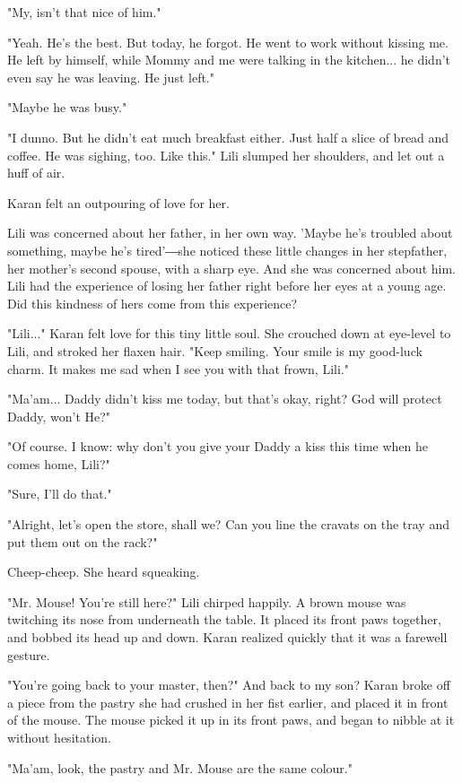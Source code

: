 "My, isn't that nice of him."

"Yeah. He's the best. But today, he forgot. He went to work without
kissing me. He left by himself, while Mommy and me were talking in the
kitchen... he didn't even say he was leaving. He just left."

"Maybe he was busy."

"I dunno. But he didn't eat much breakfast either. Just half a slice of
bread and coffee. He was sighing, too. Like this." Lili slumped her
shoulders, and let out a huff of air.

Karan felt an outpouring of love for her.

Lili was concerned about her father, in her own way. 'Maybe he's
troubled about something, maybe he's tired'―she noticed these little
changes in her stepfather, her mother's second spouse, with a sharp eye.
And she was concerned about him. Lili had the experience of losing her
father right before her eyes at a young age. Did this kindness of hers
come from this experience?

"Lili..." Karan felt love for this tiny little soul. She crouched down
at eye-level to Lili, and stroked her flaxen hair. "Keep smiling. Your
smile is my good-luck charm. It makes me sad when I see you with that
frown, Lili."

"Ma'am... Daddy didn't kiss me today, but that's okay, right? God will
protect Daddy, won't He?"

"Of course. I know: why don't you give your Daddy a kiss this time when
he comes home, Lili?"

"Sure, I'll do that."

"Alright, let's open the store, shall we? Can you line the cravats on
the tray and put them out on the rack?"

Cheep-cheep. She heard squeaking.

"Mr. Mouse! You're still here?" Lili chirped happily. A brown mouse was
twitching its nose from underneath the table. It placed its front paws
together, and bobbed its head up and down. Karan realized quickly that
it was a farewell gesture.

"You're going back to your master, then?" And back to my son? Karan
broke off a piece from the pastry she had crushed in her fist earlier,
and placed it in front of the mouse. The mouse picked it up in its front
paws, and began to nibble at it without hesitation.

"Ma'am, look, the pastry and Mr. Mouse are the same colour."

